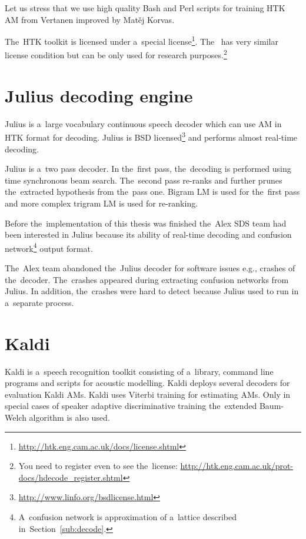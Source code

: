 Let us stress that we use high quality Bash and Perl scripts for training \ac{HTK} \ac{AM} from Vertanen improved by Matěj Korvas.\cite{vertanen_baseline_2006}\cite{korvas_2014}

The~\ac{HTK} toolkit is licensed under a~special license\footnote{\url{http://htk.eng.cam.ac.uk/docs/license.shtml}}.
The~ has very similar license condition but can be only used for research purposes.\footnote{You need to register even to see the~license: \url{http://htk.eng.cam.ac.uk/prot-docs/hdecode_register.shtml}}

\section{Julius decoding engine}
\label{sec:back_julius}

Julius is a~large vocabulary continuous speech decoder which can use \ac{AM} in \ac{HTK} format for decoding.\cite{lee2009julius}
Julius is BSD licensed\footnote{\url{http://www.linfo.org/bsdlicense.html}} and performs almost real-time decoding.

Julius is a~two pass decoder. 
In the~first pass, the~decoding is performed using time synchronous beam search.
The~second pass re-ranks and further prunes the~extracted hypothesis from the~pass one.
Bigram \ac{LM} is used for the~first pass and more complex trigram \ac{LM} is used for re-ranking.

Before the~implementation of this thesis was finished the~Alex \ac{SDS} team had been interested in Julius because its ability of real-time decoding and confusion network\footnote{A~confusion network is approximation of a~lattice described in~Section~\ref{sub:decode}.} output format.

The~Alex team abandoned the~Julius decoder for software issues e.g., crashes of the~decoder. 
The~crashes appeared during extracting confusion networks from Julius. 
In addition, the~crashes were hard to detect because Julius used to run in a~separate process.

\section{Kaldi}
\label{sec:back_kaldi}

Kaldi is a~speech recognition toolkit consisting of a~library, command line programs and scripts for acoustic modelling.
Kaldi deploys several decoders for evaluation Kaldi \acp{AM}.
Kaldi uses Viterbi training for estimating \acp{AM}. 
Only in special cases of speaker adaptive discriminative training the~extended Baum-Welch algorithm is also used\cite{povey2011kaldi}.

